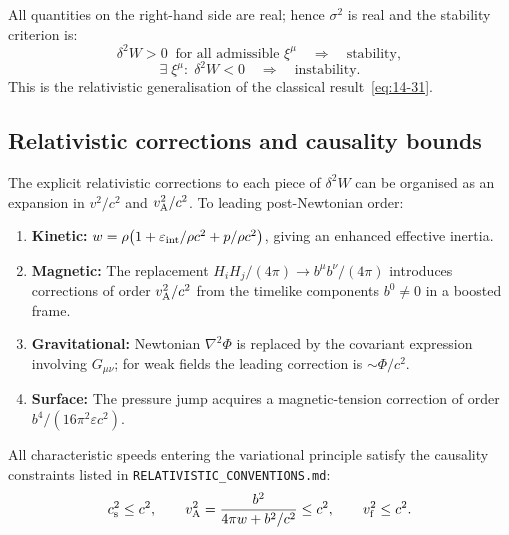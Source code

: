 All quantities on the right-hand side are real; hence $\sigma^{2}$ is
real and the stability criterion is:
\begin{equation}
  \delta^{2}W > 0
  \;\;\text{for all admissible }\xi^{\mu}
  \quad\Longrightarrow\quad
  \text{stability},
  \label{eq:rel14-stability-criterion}
\end{equation}
\begin{equation}
  \exists\;\xi^{\mu}:\;\delta^{2}W < 0
  \quad\Longrightarrow\quad
  \text{instability}.
  \label{eq:rel14-instability-criterion}
\end{equation}
This is the relativistic generalisation of the classical
result~\eqref{eq:14-31}.

\subsection{Relativistic corrections and causality
  bounds}\label{sec:rel-122-corrections}

The explicit relativistic corrections to each piece of $\delta^{2}W$
can be organised as an expansion in $v^{2}/c^{2}$ and $v_{\mathrm{A}}^{2}/c^{2}$.
To leading post-Newtonian order:
\begin{enumerate}
\item \textbf{Kinetic:} $w = \rho\bigl(1 +
  \varepsilon_{\mathrm{int}}/\rho c^{2} + p/\rho c^{2}\bigr)$, giving
  an enhanced effective inertia.
\item \textbf{Magnetic:} The replacement $H_{i}H_{j}/(4\pi) \to
  b^{\mu}b^{\nu}/(4\pi)$ introduces corrections of order
  $v_{\mathrm{A}}^{2}/c^{2}$ from the timelike components $b^{0}\neq 0$ in a
  boosted frame.
\item \textbf{Gravitational:} Newtonian $\nabla^{2}\Phi$ is replaced
  by the covariant expression involving $G_{\mu\nu}$; for weak fields
  the leading correction is $\sim\Phi/c^{2}$.
\item \textbf{Surface:} The pressure jump acquires a magnetic-tension
  correction of order $b^{4}/(16\pi^{2}\varepsilon c^{2})$.
\end{enumerate}

All characteristic speeds entering the variational principle satisfy
the causality constraints listed in
\texttt{RELATIVISTIC\_CONVENTIONS.md}:
\begin{equation}
  c_{\mathrm{s}}^{2} \le c^{2},
  \qquad
  v_{\mathrm{A}}^{2} = \frac{b^{2}}{4\pi w + b^{2}/c^{2}}\le c^{2},
  \qquad
  v_{\mathrm{f}}^{2} \le c^{2}.
  \label{eq:rel14-causality}
\end{equation}

